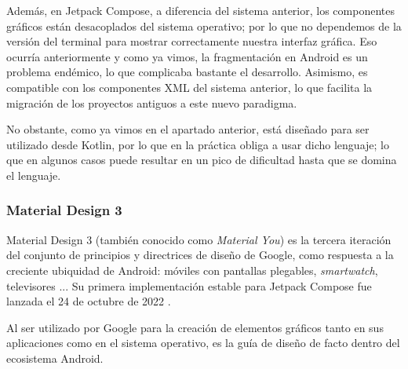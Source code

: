             Además, en Jetpack Compose, a diferencia del sistema anterior, los componentes gráficos están desacoplados 
            del sistema operativo; por lo que no dependemos de la versión del terminal para mostrar correctamente 
            nuestra interfaz gráfica. Eso ocurría anteriormente y como ya vimos, la fragmentación en Android es un 
            problema endémico, lo que complicaba bastante el desarrollo. Asimismo, es compatible con los componentes XML 
            del sistema anterior, lo que facilita la migración de los proyectos antiguos a este nuevo paradigma. \newline

            No obstante, como ya vimos en el apartado anterior, está diseñado para ser utilizado desde Kotlin, por lo 
            que en la práctica obliga a usar dicho lenguaje; lo que en algunos casos puede resultar en un pico de 
            dificultad hasta que se domina el lenguaje.
        

        \subsubsection{Material Design 3}
            Material Design 3 (también conocido como \textit{Material You}) es la tercera iteración del 
            conjunto de principios y directrices de diseño de Google, 
            como respuesta a la creciente ubiquidad de Android: móviles con pantallas
            plegables, \textit{smartwatch}, televisores \cite{ramirez_que_2022}... 
            Su primera implementación estable para Jetpack Compose fue lanzada el 
            24 de octubre de 2022 \cite{singh_material_2022}. \newline
            
            Al ser utilizado por Google para la creación de elementos 
            gráficos tanto en sus aplicaciones como en el sistema operativo, es la guía de diseño de facto dentro del
            ecosistema Android. \newline

